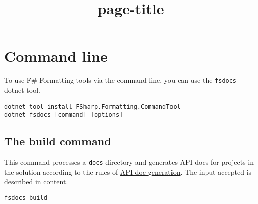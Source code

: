 \documentclass{article}
\title{{page-title}}
\date{}
\begin{document}
\maketitle


\section*{Command line}



To use F\# Formatting tools via the command line, you can use the \texttt{fsdocs} dotnet tool.
\begin{lstlisting}
dotnet tool install FSharp.Formatting.CommandTool
dotnet fsdocs [command] [options]

\end{lstlisting}
\subsection*{The build command}



This command processes a \texttt{docs} directory and generates API docs for projects in the solution according to the
rules of \href{apidocs.html}{API doc generation}. The input accepted is described in \href{content.html}{content}.
\begin{lstlisting}
fsdocs build

\end{lstlisting}
\end{document}
